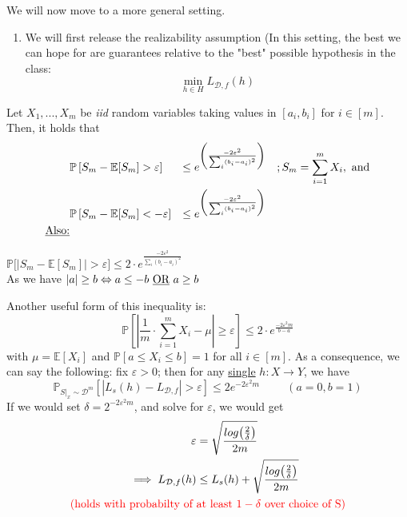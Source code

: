 \documentclass[10pt,a4paper]{article}
\theoremstyle{definition}
\theoremstyle{plain}
\begin{document}
We will now move to a more general setting.
\begin{enumerate}[label*=\protect\fbox{\arabic{enumi}}]
	\item We will first release the realizability assumption (In this setting, the best we can hope for are guarantees relative to the "best" possible hypothesis in the class: $$\min_{h \in H}{L_{\mathcal{D}, f}(h)}$$
\end{enumerate}
	\begin{boxeddef}
	Let $X_1, ..., X_m$ be \textit{iid} random variables taking values in $[a_i, b_i]$ for $i \in [m]$. Then, it holds that
	 \begin{align*}
	 	&\mathbb{P}\left[S_m - \mathbb{E}[S_m] > \varepsilon\right] &\leq e^{\left(\frac{-2 \varepsilon^2}{\sum_{i} (b_i - a_i)^2}\right)} && ; S_m = \sum_{i = 1}^{m} X_i, \text{ and}\\
	 	&\mathbb{P}\left[S_m - \mathbb{E}[S_m] < -\varepsilon\right] &\leq e^{\left(\frac{-2 \varepsilon^2}{\sum_{i} (b_i - a_i)^2}\right)}\\
	 	\text{\underline{Also:}}
	 \end{align*}
	 \begin{center}
	 	\colorbox{Apricot}{$\mathbb{P}\bigg[\big|S_m - \mathbb{E}[S_m]\big| > \varepsilon\bigg] \leq 2 \cdot e^{\frac{-2 \varepsilon^2}{\sum_{i} (b_i - a_i)^2}}$}\\
 		 As we have $|a| \geq b \Leftrightarrow a \leq -b \text{ \underline{OR} } a \geq b$
	 \end{center}


\end{boxeddef}
Another useful form of this inequality is:
$$ \mathbb{P} \left[\left| \frac{1}{m} \cdot \sum_{i = 1}^{m} X_i - \mu \right| \geq \varepsilon\right] \leq 2 \cdot e^{\frac{-2 \varepsilon^2 m}{b-a}} $$
with $\mu = \mathbb{E}[X_i]$ and $\mathbb{P}[a \leq X_i \leq b] = 1$ for all $i \in [m]$. As a consequence, we can say the following: fix $\varepsilon>0$; then for any \colorbox{Apricot}{\underline{single} $h: X \to Y$}, we have 
$$ \mathbb{P}_{S|_x \sim \mathcal{D}^m}\left[\left|L_{s}(h) - L_{\mathcal{D}, f}\right| > \varepsilon\right] \leq 2 e^{-2\varepsilon^2 m} \hspace{1cm} (a = 0, b = 1)$$
If we would set $\delta = 2^{-2 \varepsilon^2 m}$, and solve for $\varepsilon$, we would get
\begin{align*}
\varepsilon &= \sqrt{\frac{log\big(\frac{2}{\delta}\big)}{2m}}\\
\implies L_{\mathcal{D},f}(h) &\leq L_{s}(h) + \sqrt{\frac{log\big(\frac{2}{\delta}\big)}{2m}}\\
\text{\textcolor{red}{(holds with probabilty of }} & \text{\textcolor{red}{at least $1-\delta$ over choice of S)}}
\end{align*}
\end{document}
